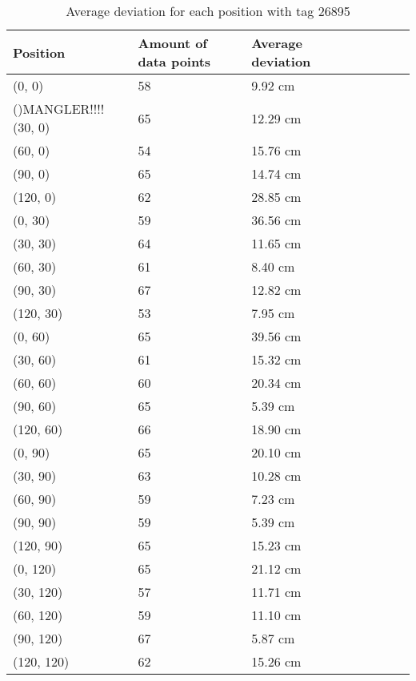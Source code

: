\begin{table}[H] 
    \centering
    \begin{tabular}{|l|l|l|l|l|l|l|l|}
    \hline
    Position   & Amount of data points  & Average deviation \\ \hline
    (0, 0)     & 58                     & 9.92 cm             \\ \hline ()MANGLER!!!!
    (30, 0)    & 65                     & 12.29 cm            \\ \hline
    (60, 0)    & 54                     & 15.76 cm            \\ \hline
    (90, 0)    & 65                     & 14.74 cm            \\ \hline
    (120, 0)   & 62                     & 28.85 cm            \\ \hline
    (0, 30)    & 59                     & 36.56 cm            \\ \hline
    (30, 30)   & 64                     & 11.65 cm             \\ \hline
    (60, 30)   & 61                     & 8.40 cm             \\ \hline
    (90, 30)   & 67                     & 12.82 cm            \\ \hline
    (120, 30)  & 53                     & 7.95 cm             \\ \hline
    (0, 60)    & 65                     & 39.56 cm            \\ \hline
    (30, 60)   & 61                     & 15.32 cm             \\ \hline
    (60, 60)   & 60                     & 20.34 cm            \\ \hline
    (90, 60)   & 65                     & 5.39 cm             \\ \hline
    (120, 60)  & 66                     & 18.90 cm            \\ \hline
    (0, 90)    & 65                     & 20.10 cm            \\ \hline
    (30, 90)   & 63                     & 10.28 cm              \\ \hline
    (60, 90)   & 59                     & 7.23 cm             \\ \hline
    (90, 90)   & 59                     & 5.39 cm             \\ \hline
    (120, 90)  & 65                     & 15.23 cm             \\ \hline
    (0, 120)   & 65                     & 21.12 cm            \\ \hline
    (30, 120)  & 57                     & 11.71 cm             \\ \hline
    (60, 120)  & 59                     & 11.10 cm             \\ \hline
    (90, 120)  & 67                     & 5.87 cm             \\ \hline
    (120, 120) & 62                     & 15.26 cm            \\ \hline
    \end{tabular}
    \label{average-deviation-1-tag}
    \caption{Average deviation for each position with tag 26895}
\end{table}

